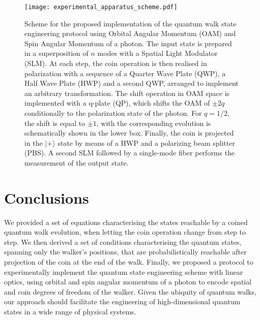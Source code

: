 \begin{figure}[ht!]
\centering
\texttt{[image: experimental\_apparatus\_scheme.pdf]}
\caption{
    Scheme for the proposed implementation of the quantum walk state engineering protocol using Orbital Angular Momentum (OAM) and Spin Angular Momentum of a photon.
    The input state is prepared in a superposition of $n$ modes with a Spatial Light Modulator (SLM).
    At each step, the coin operation is then realised in polarization with a sequence of a Quarter Wave Plate (QWP), a Half Wave Plate (HWP) and a second QWP, arranged to implement an arbitrary transformation.
    The shift operation in OAM space is implemented with a q-plate (QP), which shifts the OAM of $\pm 2q$ conditionally to the polarization state of the photon.
    For $q=1/2$, the shift is equal to $\pm 1$, with the corresponding evolution is  schematically shown in the lower box.
    Finally, the coin is projected in the $\vert + \rangle$ state by means of a HWP and a polarizing beam splitter (PBS).
    A second SLM followed by a single-mode fiber performs the measurement of the output state.
}
\label{fig:QWs:proposal_exp}
\end{figure}

\section{Conclusions}
\label{sec:QWs:conclusions}
We provided a set of equations characterising the states reachable by a coined quantum walk evolution, when letting the coin operation change from step to step.
We then derived a set of conditions characterising the quantum states, spanning only the walker's positions, that are probabilistically reachable after projection of the coin at the end of the walk.
Finally, we proposed a protocol to experimentally implement the quantum state engineering scheme with linear optics, using orbital and spin angular momentum of a photon to encode spatial and coin degrees of freedom of the walker.
Given the ubiquity of quantum walks, our approach should facilitate the engineering of high-dimensional quantum states in a wide range of physical systems.


